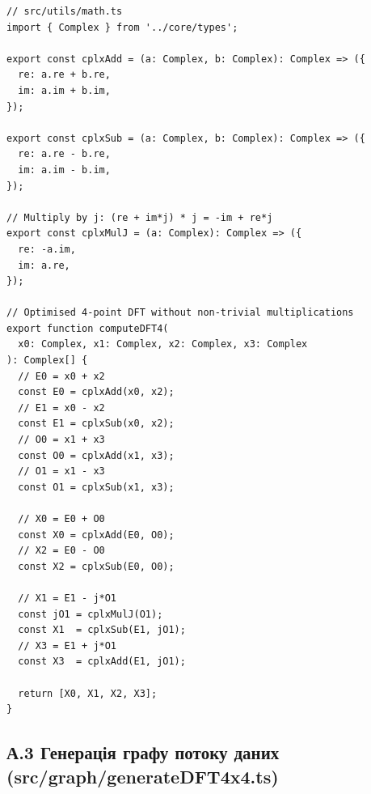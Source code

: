 \begin{lstlisting}[style=jsstyle,
  caption={Функції комплексної арифметики та алгоритм 4-точкового ДПФ},
  label={lst:math}]
// src/utils/math.ts
import { Complex } from '../core/types';

export const cplxAdd = (a: Complex, b: Complex): Complex => ({
  re: a.re + b.re,
  im: a.im + b.im,
});

export const cplxSub = (a: Complex, b: Complex): Complex => ({
  re: a.re - b.re,
  im: a.im - b.im,
});

// Multiply by j: (re + im*j) * j = -im + re*j
export const cplxMulJ = (a: Complex): Complex => ({
  re: -a.im,
  im: a.re,
});

// Optimised 4-point DFT without non-trivial multiplications
export function computeDFT4(
  x0: Complex, x1: Complex, x2: Complex, x3: Complex
): Complex[] {
  // E0 = x0 + x2
  const E0 = cplxAdd(x0, x2);
  // E1 = x0 - x2
  const E1 = cplxSub(x0, x2);
  // O0 = x1 + x3
  const O0 = cplxAdd(x1, x3);
  // O1 = x1 - x3
  const O1 = cplxSub(x1, x3);

  // X0 = E0 + O0
  const X0 = cplxAdd(E0, O0);
  // X2 = E0 - O0
  const X2 = cplxSub(E0, O0);

  // X1 = E1 - j*O1
  const jO1 = cplxMulJ(O1);
  const X1  = cplxSub(E1, jO1);
  // X3 = E1 + j*O1
  const X3  = cplxAdd(E1, jO1);

  return [X0, X1, X2, X3];
}
\end{lstlisting}

\subsection*{А.3 Генерація графу потоку даних (src/graph/generateDFT4x4.ts)}

